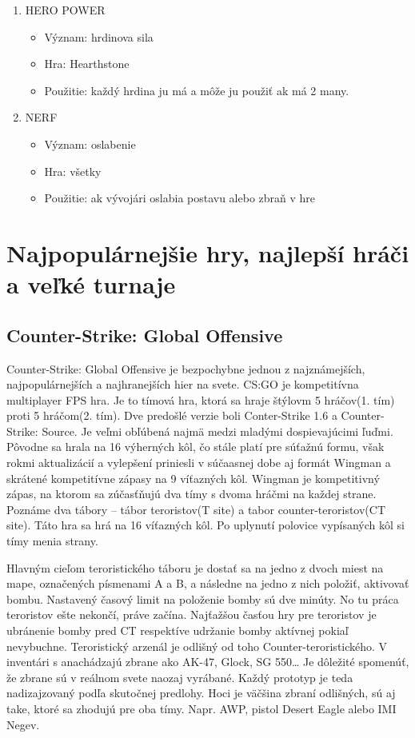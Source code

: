 \documentclass[10pt,oneside,slovak,a4paper]{article}
\begin{document}
\begin{multicols}{2}
\begin{enumerate}
.
\item HERO POWER
\begin{itemize}
 \item Význam: hrdinova sila
 \item Hra: Hearthstone
 \item Použitie: každý hrdina ju má a môže ju použiť ak má 2 many.
\cite{a1}
\end{itemize}

\item NERF
\begin{itemize}
 \item Význam: oslabenie
 \item Hra: všetky
 \item Použitie: ak vývojári oslabia postavu alebo zbraň v hre 
\cite{a1}
\end{itemize}
\end{enumerate}
\end{multicols}


\section{Najpopulárnejšie hry, najlepší hráči a veľké turnaje} \label{hry} 

\subsection{Counter-Strike: Global Offensive} \label{hry:csgo}

Counter-Strike: Global Offensive je bezpochybne jednou z najznámejších, najpopulárnejších a najhranejších hier na svete. CS:GO je kompetitívna multiplayer FPS hra. Je to tímová hra, ktorá sa hraje štýlovm 5 hráčov(1. tím) proti 5 hráčom(2. tím). Dve predošlé verzie boli Conter-Strike 1.6 a Counter-Strike: Source. Je veľmi obľúbená najmä medzi mladými dospievajúcimi ľuďmi. Pôvodne sa hrala na 16 výherných kôl, čo stále platí pre súťažnú formu, však rokmi aktualizácií a vylepšení priniesli v súčaasnej dobe aj formát Wingman a skrátené kompetitívne zápasy na 9 víťazných kôl. Wingman je kompetitivný zápas, na ktorom sa zúčasťňujú dva tímy s dvoma hráčmi na každej strane. Poznáme dva tábory – tábor teroristov(T site) a tabor counter-teroristov(CT site). Táto hra sa hrá na 16 víťazných kôl. Po uplynutí polovice vypísaných kôl si tímy menia strany.\cite{a1}

Hlavným cieľom teroristického táboru je dostať sa na jedno z dvoch miest na mape, označených písmenami A a B, a následne na jedno z nich položiť, aktivovať bombu. Nastavený časový limit na položenie bomby sú dve minúty. No tu práca teroristov ešte nekončí, práve začína. Najťažšou časťou hry pre teroristov je ubránenie bomby pred CT respektíve udržanie bomby aktívnej pokiaľ nevybuchne. Teroristický arzenál je odlišný od toho Counter-teroristického. V inventári s anachádzajú zbrane ako AK-47, Glock, SG 550… Je dôležité spomenúť, že zbrane sú v reálnom svete naozaj vyrábané. Každý prototyp je teda nadizajzovaný podľa skutočnej predlohy. Hoci je väčšina zbraní odlišných, sú aj take, ktoré sa zhodujú pre oba tímy. Napr. AWP, pistol Desert Eagle alebo IMI Negev.\cite{a1}
\end{document}
